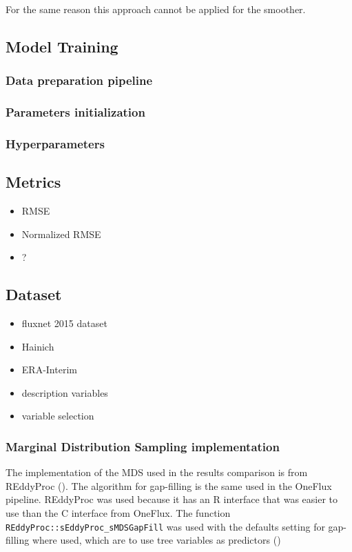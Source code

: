 \documentclass{article}
\let\Oldsubsection\subsection
\renewcommand{\subsection}{\FloatBarrier\Oldsubsection}
\let\Oldsubsubsection\subsubsection
\renewcommand{\subsubsection}{\FloatBarrier\Oldsubsubsection}
\begin{document}
For the same reason this approach cannot be applied for the smoother.

\subsection{Model Training}

\subsubsection{Data preparation pipeline}
\subsubsection{Parameters initialization}

\subsubsection{Hyperparameters}

\subsection{Metrics}

\begin{itemize}
    \item RMSE
    \item Normalized RMSE
    \item ?
\end{itemize}

\subsection{Dataset}

\begin{itemize}
    \item fluxnet 2015 dataset
    \item Hainich
    \item ERA-Interim
    \item description variables
\item variable selection
\end{itemize}

\subsubsection{Marginal Distribution Sampling implementation}

The implementation of the MDS used in the results comparison is from REddyProc (\cite{wutzler_basic_2018}). The algorithm for gap-filling is the same used in the OneFlux pipeline. REddyProc was used because it has an R interface that was easier to use than the C interface from OneFlux.
The function \verb|REddyProc::sEddyProc_sMDSGapFill| was used with the defaults setting for gap-filling where used, which are to use tree variables as predictors ()
\end{document}
